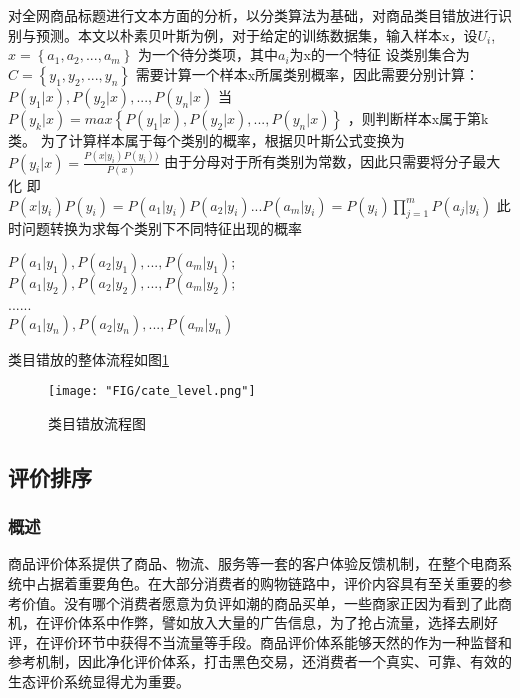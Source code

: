 对全网商品标题进行文本方面的分析，以分类算法为基础，对商品类目错放进行识别与预测。本文以朴素贝叶斯为例，对于给定的训练数据集，输入样本x，设$U_i$,$x=\left \{ a_{1},a_{2},...,a_{m} \right \}$ 为一个待分类项，其中$a_{i}$为x的一个特征
设类别集合为$C=\left \{ y_{1},y_{2},...,y_{n} \right \}$ 需要计算一个样本x所属类别概率，因此需要分别计算：
$P\left ( y_{1} |x\right ),P\left ( y_{2} |x\right ),...,P\left ( y_{n} |x\right )$
当$P\left ( y_{k} |x\right )=max\left \{ P\left ( y_{1} |x\right ),P\left ( y_{2} |x\right ),...,P\left ( y_{n} |x\right ) \right \}$ ，则判断样本x属于第k类。
为了计算样本属于每个类别的概率，根据贝叶斯公式变换为
$P\left ( y_{i} |x\right )=\frac{P\left ( x|y_{i} \right )P(y_{i}))}{P\left ( x \right )}$
由于分母对于所有类别为常数，因此只需要将分子最大化
即$P\left ( x|y_{i} \right )P(y_{i})=P\left ( a_{1} |y_{i}\right )P\left ( a_{2} |y_{i}\right )...P\left ( a_{m} |y_{i}\right )=P\left ( y_{i} \right )\prod_{j=1}^{m}P\left ( a_{j}|y_{i} \right )$
此时问题转换为求每个类别下不同特征出现的概率\\
\begin{center}
	$P\left ( a_{1} |y_{1}\right ),P\left ( a_{2} |y_{1}\right ),...,P\left ( a_{m} |y_{1}\right );$\\
	$P\left ( a_{1} |y_{2}\right ),P\left ( a_{2} |y_{2}\right ),...,P\left ( a_{m} |y_{2}\right );$\\
	......\\
	$P\left ( a_{1} |y_{n}\right ),P\left ( a_{2} |y_{n}\right ),...,P\left ( a_{m} |y_{n}\right )$\\	
\end{center}

类目错放的整体流程如图\ref{fig:chap12_cate_level}
\begin{figure}
	\centering
	\texttt{[image: "FIG/cate\_level.png"]}
	\caption{类目错放流程图}
	\label{fig:chap12_cate_level}
\end{figure}

\subsection{评价排序}

\subsubsection{概述}

商品评价体系提供了商品、物流、服务等一套的客户体验反馈机制，在整个电商系统中占据着重要角色。在大部分消费者的购物链路中，评价内容具有至关重要的参考价值。没有哪个消费者愿意为负评如潮的商品买单，一些商家正因为看到了此商机，在评价体系中作弊，譬如放入大量的广告信息，为了抢占流量，选择去刷好评，在评价环节中获得不当流量等手段。商品评价体系能够天然的作为一种监督和参考机制，因此净化评价体系，打击黑色交易，还消费者一个真实、可靠、有效的生态评价系统显得尤为重要。

